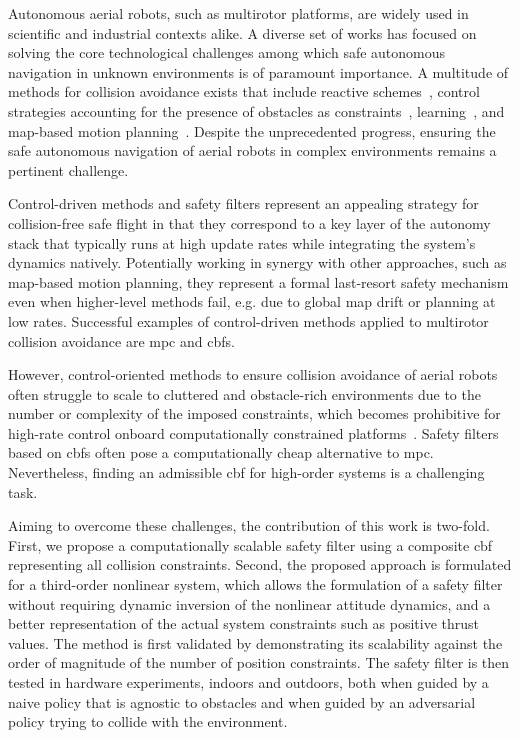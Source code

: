 

Autonomous aerial robots, such as multirotor platforms, are widely used in scientific and industrial contexts alike. A diverse set of works has focused on solving the core technological challenges among which safe autonomous navigation in unknown environments is of paramount importance. A multitude of methods for collision avoidance exists that include reactive schemes~\cite{alejo2016reactive}, control strategies accounting for the presence of obstacles as constraints~\cite{dentler2016real,alexis2016robust}, learning~\cite{kahn2017uncertainty,kulkarni2024reinforcement}, and map-based motion planning~\cite{karaman2011sampling,allen2016real}. Despite the unprecedented progress, ensuring the safe autonomous navigation of aerial robots in complex environments remains a pertinent challenge.

Control-driven methods and safety filters represent an appealing strategy for collision-free safe flight in that they correspond to a key layer of the autonomy stack that typically runs at high update rates while integrating the system's dynamics natively. Potentially working in synergy with other approaches, such as map-based motion planning, they represent a formal last-resort safety mechanism even when higher-level methods fail, e.g. due to global map drift or planning at low rates. Successful examples of control-driven methods applied to multirotor collision avoidance are \ac{mpc} and \acp{cbf}. 

However, control-oriented methods to ensure collision avoidance of aerial robots often struggle to scale to cluttered and obstacle-rich environments due to the number or complexity of the imposed constraints, which becomes prohibitive for high-rate control onboard computationally constrained platforms~\cite{alexis2016robust}. Safety filters based on \acp{cbf} often pose a computationally cheap alternative to \ac{mpc}. Nevertheless, finding an admissible \ac{cbf} for high-order systems is a challenging task.

Aiming to overcome these challenges, the contribution of this work is two-fold. First, we propose a computationally scalable safety filter using a composite \ac{cbf} representing all collision constraints. Second, the proposed approach is formulated for a third-order nonlinear system, which allows the formulation of a safety filter without requiring dynamic inversion of the nonlinear attitude dynamics, and a better representation of the actual system constraints such as positive thrust values.
The method is first validated by demonstrating its scalability against the order of magnitude of the number of position constraints. The safety filter is then tested in hardware experiments, indoors and outdoors, both when guided by a naive policy that is agnostic to obstacles and when guided by an adversarial policy trying to collide with the environment.

